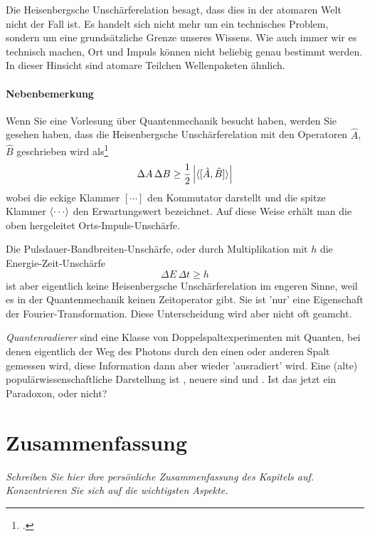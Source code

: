 Die Heisenbergsche Unschärferelation besagt, dass dies in der atomaren Welt nicht der Fall ist. Es handelt sich nicht mehr um ein technisches Problem, sondern um eine grundsätzliche Grenze unseres Wissens. Wie auch immer wir es technisch machen, Ort und Impuls können nicht beliebig genau bestimmt werden. In dieser Hinsicht sind atomare Teilchen Wellenpaketen ähnlich.

\paragraph*{Nebenbemerkung} Wenn Sie eine Vorlesung über Quantenmechanik besucht haben, werden Sie gesehen haben, dass die Heisenbergsche Unschärferelation mit den Operatoren $\hat{A}$, $\hat{B}$ geschrieben wird als\footcite{Nolting-QM} 
\begin{equation}
    \Delta A \, \Delta B \ge \frac{1}{2} \left|   \braket{ [\hat{A}, \hat{B}]  } \right|
\end{equation}
wobei die eckige Klammer $[ \cdots]$ den Kommutator darstellt und die spitze Klammer $\braket{\cdots}$ den Erwartungswert bezeichnet. Auf diese Weise erhält man die oben hergeleitet Orts-Impuls-Unschärfe.

Die Pulsdauer-Bandbreiten-Unschärfe, oder durch Multiplikation mit $h$ die Energie-Zeit-Unschärfe
\begin{equation}
    \Delta E \, \Delta t \ge h
\end{equation}
ist aber eigentlich keine Heisenbergsche Unschärferelation im engeren Sinne, weil es in der Quantenmechanik keinen Zeitoperator gibt. Sie ist 'nur' eine Eigenschaft der Fourier-Transformation. Diese Unterscheidung wird aber nicht oft geamcht.


\begin{questions}
    \item \emph{Quantenradierer} sind eine Klasse von Doppelspaltexperimenten mit Quanten, bei denen eigentlich der Weg des Photons durch den einen oder anderen Spalt gemessen wird, diese Information dann aber wieder 'ausradiert' wird. Eine (alte) populärwissenschaftliche Darstellung ist \cite{WT_dualismus}, neuere sind \cite{heise_quantenradierer} und \cite{Hossenfelder_quantenradierer}. Ist das jetzt ein Paradoxon, oder nicht?
\end{questions}



\section{Zusammenfassung}

\textit{Schreiben Sie hier ihre persönliche Zusammenfassung des Kapitels auf. Konzentrieren Sie sich auf die wichtigsten Aspekte.}

\vspace*{10cm}




\printbibliography[segment=\therefsegment,heading=subbibliography]
